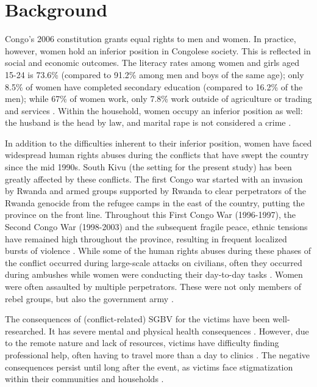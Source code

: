 \section{Background}
Congo's 2006 constitution grants equal rights to men and women. In practice, however, women hold an inferior position in Congolese society. This is reflected in social and economic outcomes. The literacy rates among women and girls aged 15-24 is 73.6\% (compared to 91.2\% among men and boys of the same age); only 8.5\% of women have completed secondary education (compared to 16.2\% of the men); while 67\% of women work, only 7.8\% work outside of agriculture or trading and services \citep{DHSCongoReport}. Within the household, women occupy an inferior position as well: the husband is the head by law, and marital rape is not considered a crime \citep{Kilonzo2009}. 

In addition to the difficulties inherent to their inferior position, women have faced widespread human rights abuses during the conflicts that have swept the country since the mid 1990s. South Kivu (the setting for the present study) has been greatly affected by these conflicts. The first Congo war started with an invasion by Rwanda and armed groups supported by Rwanda to clear perpetrators of the Rwanda genocide from the refugee camps in the east of the country, putting the province on the front line. Throughout this First Congo War (1996-1997), the Second Congo War (1998-2003) and the subsequent fragile peace, ethnic tensions have remained high throughout the province, resulting in frequent localized bursts of violence \citep[see e.g.][]{Verwijen2016}. While some of the human rights abuses during these phases of the conflict occurred during large-scale attacks on civilians, often they occurred during ambushes while women were conducting their day-to-day tasks \citep{Freedman2011,HRW2002}. Women were often assaulted by multiple perpetrators. These were not only members of rebel groups, but also the government army \citep{HumanRightsWatch2009}. 

The consequences of (conflict-related) SGBV for the victims have been well-researched. It has severe mental and physical health consequences \citep{Johnson2010}. However, due to the remote nature and lack of resources, victims have difficulty finding professional help, often having to travel more than a day to clinics \citep{HarvardHumanitarianInitiative2009,Kohli2012}. The negative consequences persist until long after the event, as victims face stigmatization within their communities and households \citep{Albutt2017,HarvardHumanitarianInitiative2009}.

